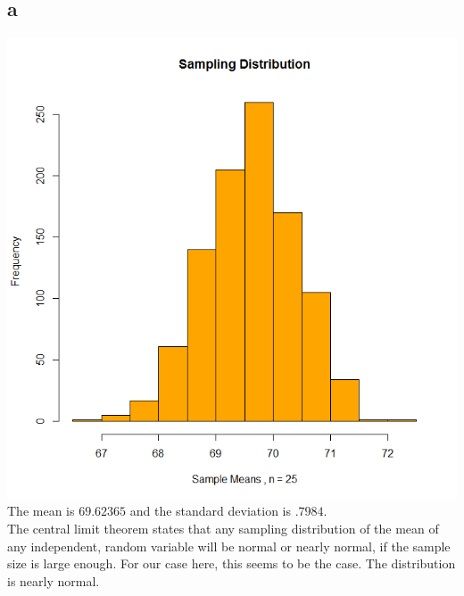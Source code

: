 \documentclass[10pt,letterpaper]{article}
\begin{document}
\subsection*{a}
\includegraphics[scale=.5]{sampling}\\
The mean is $69.62365$ and the standard deviation is $.7984$.\\
The central limit theorem states that any sampling distribution of the mean of
any independent, random variable will be normal or nearly normal, if the sample
size is large enough. For our case here, this seems to be the case. The 
distribution is nearly normal.
\end{document}
